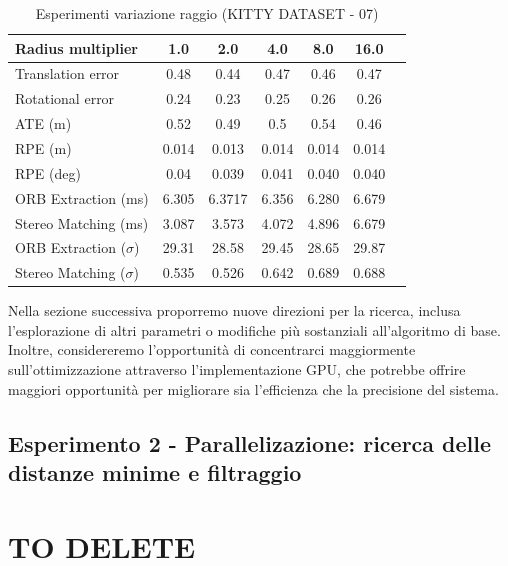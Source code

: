 \documentclass[12pt,a4paper]{report}
\begin{document}
\newpage
\begin{table}[h]
    \centering
    \caption{Esperimenti variazione raggio (KITTY DATASET - 07) }
    \begin{tabular}{lcccccc}
        \toprule
        \rowcolor{gray!20}
        Radius multiplier & 1.0 & \cellcolor{orange!40}2.0 & 4.0 & 8.0 & 16.0 \\
        \midrule
        Translation error & 0.48 & \cellcolor{green!20}0.44 & 0.47 & 0.46 & 0.47 \\
        Rotational error  & 0.24 & \cellcolor{green!20}0.23 & 0.25 & 0.26 & 0.26 \\
        ATE (m)           & 0.52 & 0.49 & 0.5 & 0.54 & \cellcolor{green!20}0.46 \\
        RPE (m)           & 0.014 & \cellcolor{green!20}0.013 & 0.014 & 0.014 & 0.014 \\
        RPE (deg)         & 0.04 & \cellcolor{green!20}0.039 & 0.041 & 0.040 & 0.040 \\
        ORB Extraction (ms) & 6.305 & 6.3717 & 6.356 & \cellcolor{green!20}6.280 & 6.679 \\
        Stereo Matching (ms) & \cellcolor{green!20}3.087 & 3.573 & 4.072 & 4.896 & 6.679 \\
        ORB Extraction ($\sigma$) & 29.31 & \cellcolor{green!20}28.58 & 29.45 & 28.65 & 29.87 \\
        Stereo Matching ($\sigma$) & 0.535 & \cellcolor{green!20}0.526 & 0.642 & 0.689 & 0.688 \\
        \bottomrule
    \end{tabular}
\end{table}

Nella sezione successiva proporremo nuove direzioni per la ricerca, inclusa l'esplorazione di altri parametri o modifiche più sostanziali all'algoritmo di base. Inoltre, considereremo l'opportunità di concentrarci maggiormente sull'ottimizzazione attraverso l'implementazione GPU, che potrebbe offrire maggiori opportunità per migliorare sia l'efficienza che la precisione del sistema.


\newpage
\section{Esperimento 2 - Parallelizazione: ricerca delle distanze minime e filtraggio}

\chapter{TO DELETE}
\end{document}
